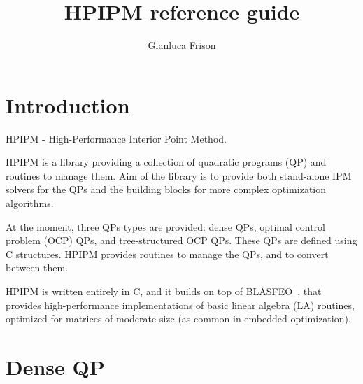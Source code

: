 \documentclass[a4paper]{report}
\title{HPIPM reference guide}
\author{Gianluca Frison}
\begin{document}
\maketitle
\tableofcontents





\chapter{Introduction}

HPIPM - High-Performance Interior Point Method.

HPIPM is a library providing a collection of quadratic programs (QP) and routines to manage them.
Aim of the library is to provide both stand-alone IPM solvers for the QPs and the building blocks for more complex optimization algorithms.

At the moment, three QPs types are provided: dense QPs, optimal control problem (OCP) QPs, and tree-structured OCP QPs.
These QPs are defined using C structures.
HPIPM provides routines to manage the QPs, and to convert between them.

HPIPM is written entirely in C, and it builds on top of BLASFEO~\cite{BLASFEO}, that provides high-performance implementations of basic linear algebra (LA) routines, optimized for matrices of moderate size (as common in embedded optimization).



\chapter{Dense QP}
\end{document}
